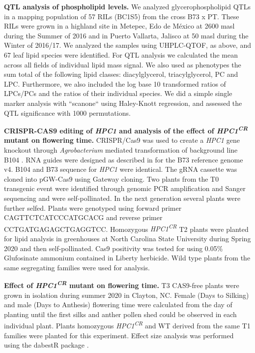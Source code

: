\documentclass[9pt,twocolumn,twoside,lineno]{BioRxiv}
\begin{document}
\textbf{QTL analysis of phospholipid levels.}
We analyzed glycerophospholipid QTLs in a mapping population of 57 RILs (BC1S5) from the cross B73 x PT.
These RILs were grown in a highland site in Metepec, Edo de México at 2600 masl during the Summer of 2016 and in Puerto Vallarta, Jalisco at 50 masl during the Winter of 2016/17.  
We analyzed the samples using UHPLC-QTOF, as above, and 67 leaf lipid species were identified.
For QTL analysis we calculated the mean across all fields of individual lipid mass signal. 
We also used as phenotypes the sum total of the following lipid classes: diacylglycerol, triacylglycerol, PC and  LPC.  
Furthermore,  we also included the log base 10 transformed ratios of LPCs/PCs and the ratios of their individual species. 
We did a simple single marker analysis  with ``scanone`` using Haley-Knott  regression, and assessed the QTL significance with 1000 permutations.

\textbf{CRISPR-CAS9 editing of \textit{HPC1} and analysis of the effect of \textit{HPC1\textsuperscript{CR}} mutant on flowering time.}
CRISPR/Cas9 was used to create a \textit{HPC1} gene knockout through \textit{Agrobacterium} mediated transformation of background line B104 \cite{Wu2020-nq, Char2017-uk}. 
RNA guides were designed as described in \cite{Brazelton2015-co} for the B73 reference genome v4. 
B104 and B73 sequence for \textit{HPC1} were identical. 
The gRNA cassette was cloned into pGW-Cas9 using Gateway cloning. 
Two plants from the T0 transgenic event were identified through genomic PCR amplification and Sanger sequencing and were self-pollinated. 
In the next generation several plants were further selfed.
Plants were genotyped using forward primer CAGTTCTCATCCCATGCACG and reverse primer CCTGATGAGAGCTGAGGTCC.
Homozygous \textit{HPC1\textsuperscript{CR}} T2 plants were  planted for lipid analysis in greenhouses at  North Carolina State University during Spring 2020 and then self-pollinated. 
Cas9 positivity was tested for using 0.05\% Glufosinate ammonium contained in Liberty herbicide. 
Wild type plants from the same segregating families were used for analysis.

\textbf{Effect of \textit{HPC1\textsuperscript{CR}} mutant on flowering time.}
T3 CAS9-free plants were grown in isolation during summer 2020 in Clayton, NC. 
Female (Days to Silking) and male (Days to Anthesis) flowering time were calculated from the day of planting until the first silks and anther pollen shed could be observed in each individual plant. 
Plants homozygous \textit{HPC1\textsuperscript{CR}} and WT derived from the same T1 families were planted for this experiment. 
Effect size analysis was performed using the dabestR package \cite{Ho2019-yl}.
\end{document}
